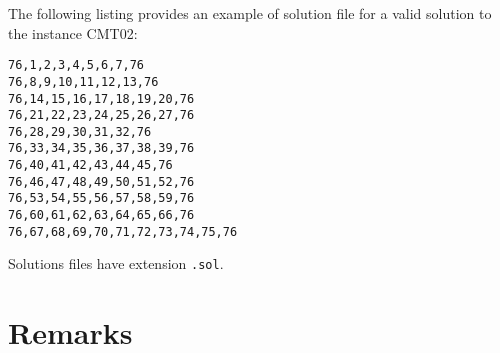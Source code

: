 The following listing provides an example of solution file for a valid
solution to the instance CMT02:

\begin{lstlisting}
76,1,2,3,4,5,6,7,76
76,8,9,10,11,12,13,76
76,14,15,16,17,18,19,20,76
76,21,22,23,24,25,26,27,76
76,28,29,30,31,32,76
76,33,34,35,36,37,38,39,76
76,40,41,42,43,44,45,76
76,46,47,48,49,50,51,52,76
76,53,54,55,56,57,58,59,76
76,60,61,62,63,64,65,66,76
76,67,68,69,70,71,72,73,74,75,76 
\end{lstlisting}

Solutions files have extension \verb!.sol!.



\section*{Remarks}

